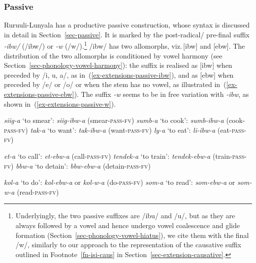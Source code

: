 \subsubsection{Passive}\label{sec-extension-passive}
\largerpage
Ruruuli-Lunyala has a productive passive construction, whose syntax is dis\-cussed in detail in Section~\ref{sec-passive}. 
It is marked by the post-radical/ pre-final suffix \textit{-ibw/} (/ibw/) or \textit{-w} (/w/).\footnote{Underlyingly, the two passive suffixes are /ibu/ and /u/, but as they are always followed by a vowel and hence undergo vowel coalescence and glide formation (Section~\ref{sec-phonology-vowel-hiatus}), we cite them with the final /w/, similarly to our approach to the representation of the causative suffix outlined in Footnote~\ref{fn-isi-caus} in Section~\ref{sec-extension-causative}.}  
/ibw/ has two allomorphs, viz.\,[ibw] and [ebw]. 
The distribution of the two allomorphs is conditioned by vowel harmony (see Section~\ref{sec-phonology-vowel-harmony}): the suffix is realised as [ibw] when preceded by /i, u, a/, as in~(\ref{ex-extensions-passive-ibw}), and as [ebw] when preceded by /e/ or /o/ or when the stem has no vowel, as illustrated in~(\ref{ex-extensions-passive-ebw}). 
The suffix \textit{-w} seems to be in free variation with \textit{-ibw}, as shown in~(\ref{ex-extensions-passive-w}).

\ea \label{ex-extensions-passive-ibw}
\begin{xlist}
\ex \textit{siig-a} `to smear': \textit{siig-ibw-a} (smear-\textsc{pass}-\textsc{fv})
\ex \textit{sumb-a} `to cook': \textit{sumb-ibw-a} (cook-\textsc{pass}-\textsc{fv})
\ex \textit{tak-a} `to want':	\textit{tak-ibw-a} (want-\textsc{pass}-\textsc{fv})
\ex \textit{ly-a} `to eat':	\textit{li-ibw-a} (eat-\textsc{pass}-\textsc{fv})
\end{xlist}
\z

\ea \label{ex-extensions-passive-ebw}
\begin{xlist}
\ex \textit{et-a}	`to call':	\textit{et-ebw-a} (call-\textsc{pass}-\textsc{fv})
\ex \textit{tendek-a}	`to train':	\textit{tendek-ebw-a} (train-\textsc{pass}-\textsc{fv})
\ex \textit{bbw-a}	`to detain':	\textit{bbw-ebw-a} (detain-\textsc{pass}-\textsc{fv})
\end{xlist}
\z

\ea \label{ex-extensions-passive-w}
\begin{xlist}
\ex \textit{kol-a}	`to do':		\textit{kol-ebw-a} or \textit{kol-w-a} (do-\textsc{pass}-\textsc{fv})
\ex \textit{som-a}	`to read':	\textit{som-ebw-a} or \textit{som-w-a} (read-\textsc{pass}-\textsc{fv})
\end{xlist}
\z


